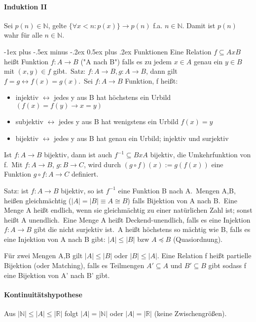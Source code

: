 \documentclass[10pt,landscape]{article}
\makeatletter
\renewcommand{\section}{\@startsection{section}{1}{0mm}%
                                {-1ex plus -.5ex minus -.2ex}%
                                {0.5ex plus .2ex}%
                                {\normalfont\large\bfseries}}
\makeatother
\begin{document}
\begin{multicols}{3}
\paragraph{Induktion II}
Sei $p(n)\in \mathbb{N}$, gelte $\{\forall x < n: p(x)\} \rightarrow p(n)$ f.a. $n\in \mathbb{N}$. Damit ist $p(n)$ wahr für alle $n\in \mathbb{N}$.



\section{Funktionen}
Eine Relation $f\subseteq A x B$ heißt Funktion $f:A\rightarrow B$ ("A nach B") falls es zu jedem $x\in A$ genau ein $y\in B$ mit $(x,y)\in f$ gibt.\
Satz: $f:A\rightarrow B, g:A\rightarrow B$, dann gilt $f=g \leftrightarrow f(x)=g(x)$.\
Sei $f:A\rightarrow B$ Funktion, f heißt:
\begin{itemize}
    \item injektiv $\leftrightarrow$ jedes y aus B hat höchstens ein Urbild $(f(x)=f(y)\rightarrow x=y)$
    \item subjektiv $\leftrightarrow$ jedes y aus B hat wenigstens ein Urbild $f(x)=y$
    \item bijektiv $\leftrightarrow$ jedes y aus B hat genau ein Urbild; injektiv und surjektiv
\end{itemize}
Ist $f:A\rightarrow B$ bijektiv, dann ist auch $f^{-1}\subseteq BxA$ bijektiv, die Umkehrfunktion von f.\
Mit $f:A\rightarrow B$, $g:B\rightarrow C$, wird durch $(g \circ f)(x):=g(f(x))$ eine Funktion $g \circ f: A \rightarrow C$ definiert.\

Satz: ist $f:A\rightarrow B$ bijektiv, so ist $f^{-1}$ eine Funktion B nach A.\
Mengen A,B, heißen gleichmächtig ($|A|=|B| \equiv A\cong B$) falls Bijektion von A nach B.\
Eine Menge A heißt endlich, wenn sie gleichmächtig zu einer natürlichen Zahl ist; sonst heißt A unendlich.\
Eine Menge A heißt Deckend-unendlich, falls es eine Injektion $f:A\rightarrow B$ gibt die nicht surjektiv ist.\
A heißt höchstens so mächtig wie B, falls es eine Injektion von A nach B gibt: $|A|\leq |B|$ bzw $A\preceq B$ (Quasiordnung).

Für zwei Mengen A,B gilt $|A|\leq |B|$ oder $|B| \leq |A|$. Eine Relation f heißt partielle Bijektion (oder Matching), falls es Teilmengen $A'\subseteq A$ und $B'\subseteq B$ gibt sodass f eine Bijektion von A' nach B' gibt.

\paragraph{Kontinuitätshypothese}
Aus $|\mathbb{N}|\leq |A| \leq |\mathbb{R}|$ folgt $|A|=|\mathbb{N}|$ oder $|A|=|\mathbb{R}|$ (keine Zwischengrößen).


\end{multicols}
\end{document}
